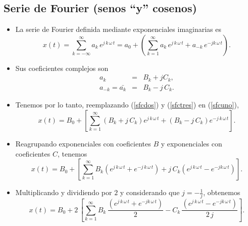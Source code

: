 \begin{itemize}
\end{itemize}

\subsection{Serie de Fourier (senos ``y'' cosenos)}

\begin{itemize}

\item La serie de Fourier definida mediante exponenciales imaginarias es
\begin{equation}
        x\left( t\right) =\sum_{k=-\infty }^{\infty }a_{k} \, e^{j \, k \, \omega \, t} =
	a_{0}+
	\left( \sum_{k=1}^{\infty }a_{k} \, e^{j \, k \, \omega \, t}+a_{-k} \, e^{-jk \, \omega \, t}\right) .
         \label{sfcuno}
\end{equation}

\item Sus coeficientes complejos son
\begin{eqnarray}
        a_{k} &=&B_{k}+jC_{k},  \label{sfcdos} \\
        a_{-k} = \bar{a_{k}} &=&B_{k}-j \, C_{k}. \label{sfctres}
\end{eqnarray}

\item Tenemos por lo tanto, reemplazando (\ref{sfcdos}) y (\ref{sfctres})  en (\ref{sfcuno}),
\begin{equation}
        x\left( t\right) =
                B_{0}+
                \left[ \sum_{k=1}^{\infty }\left(B_{k}+j \, C_{k}\right) e^{j \, k \, \omega \, t}+
                \left( B_{k}-j \, C_{k}\right) e^{-j \, k \, \omega \, t}\right].
\end{equation}

\item Reagrupando exponenciales con coeficientes $B$ y exponenciales con coeficientes $C$, tenemos
\begin{equation}
        x\left( t\right) =
                B_{0}+
                \left[ \sum_{k=1}^{\infty }B_{k}
        \left( e^{j \, k \, \omega \, t}+e^{-j \, k \, \omega \, t}\right) +j \, C_{k}\left( e^{j \, k \, \omega \, t}-e^{-jk \, \omega \, t}\right) \right].
\end{equation}

\item Multiplicando y dividiendo por $2$ y considerando que $j = -\frac{1}{j}$, obtenemos
\begin{equation}
x\left( t\right) = 
  B_{0} +
  2 \, \left[ \sum_{k=1}^{\infty}
             B_{k} \, \frac{\left(e^{j \, k \, \omega \, t}+e^{-jk \, \omega \, t}\right) }{2}-
             C_{k} \, \frac{\left( e^{j \, k \, \omega \, t}-e^{-jk \, \omega \, t}\right) }{2 \, j}
       \right].
\end{equation}


\end{itemize}
